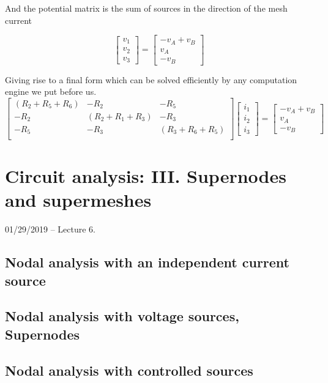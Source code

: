 \documentclass[11pt]{book}
\begin{document}
And the potential matrix is the sum of sources in the direction of the mesh current

\begin{equation}
		\begin{bmatrix}
		v_1 \\ v_2 \\ v_3
	\end{bmatrix}
	=
	\begin{bmatrix}
		-v_A + v_B \\ v_A \\ -v_B
	\end{bmatrix}
\end{equation}

Giving rise to a final form which can be solved efficiently by any computation engine we put before us.
\begin{equation}
	\begin{bmatrix}
		(R_2 + R_5 + R_6) & -R_2 & -R_5 \\
		-R_2 & (R_2 + R_1 + R_3) & -R_3 \\
		-R_5 & -R_3 & (R_3 + R_6 + R_5) \\
	\end{bmatrix}
	\begin{bmatrix}
		i_1 \\ i_2 \\ i_3
	\end{bmatrix}
	=
	\begin{bmatrix}
		-v_A + v_B \\ v_A \\ -v_B
	\end{bmatrix}
\end{equation}



\chapter{Circuit analysis: III. Supernodes and supermeshes}
01/29/2019 – Lecture 6. 
\section{Nodal analysis with an independent current source}
\section{Nodal analysis with voltage sources, \textbf{Supernodes}}
\section{Nodal analysis with controlled sources}
\end{document}
